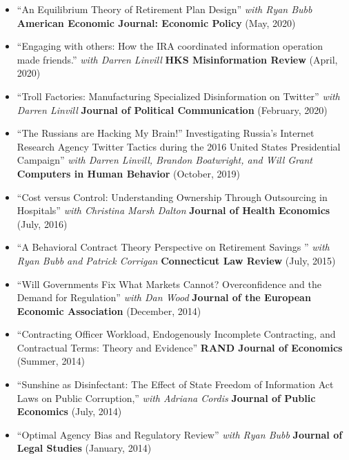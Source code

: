 \documentclass[10pt]{article}
\newenvironment{outerlist}[1][\enskip\textbullet]%
        {\begin{itemize}[#1]}{\end{itemize}%
         \vspace{-.6\baselineskip}}
\begin{document}
\begin{outerlist}
       \item[] ``An Equilibrium Theory of Retirement Plan Design'' \quad \emph{with Ryan Bubb} \textbf{American Economic Journal: Economic Policy} (May, 2020)

\item [] ``Engaging with others: How the IRA coordinated information operation made friends.'' \quad \emph{with Darren Linvill} \textbf{HKS Misinformation Review} (April, 2020)

\item [] ``Troll Factories: Manufacturing Specialized Disinformation on Twitter'' \quad \emph{with Darren Linvill} \textbf{Journal of Political Communication} (February, 2020)

    \item[] ``The Russians are Hacking My Brain!” Investigating Russia’s Internet Research Agency Twitter Tactics during the 2016 United
States Presidential Campaign'' \quad \emph{with Darren Linvill, Brandon Boatwright, and Will Grant} \textbf{Computers in Human Behavior} (October, 2019)

    \item[] ``Cost versus Control: Understanding Ownership Through Outsourcing in Hospitals'' \quad \emph{with Christina Marsh Dalton} \textbf{Journal of Health Economics} (July, 2016)

    \item[] ``A Behavioral Contract Theory Perspective on Retirement Savings '' \quad \emph{with Ryan Bubb and Patrick Corrigan} \textbf{Connecticut Law Review} (July, 2015)

    \item[] ``Will Governments Fix What Markets Cannot? Overconfidence and the Demand for Regulation'' \quad \emph{with Dan Wood} \textbf{Journal of the European Economic Association} (December, 2014)

    \item[] ``Contracting Officer Workload, Endogenously Incomplete Contracting, and Contractual Terms: Theory and Evidence'' \quad \textbf{RAND Journal of Economics} (Summer, 2014)


    \item[] ``Sunshine as Disinfectant: The Effect of State Freedom of Information Act Laws on Public Corruption,'' \quad \emph{with Adriana Cordis} \textbf{Journal of Public Economics} (July, 2014)


    \item[] ``Optimal Agency Bias and Regulatory Review'' \quad \emph{with Ryan Bubb} \textbf{Journal of Legal Studies} (January, 2014)



\end{outerlist}
\end{document}
